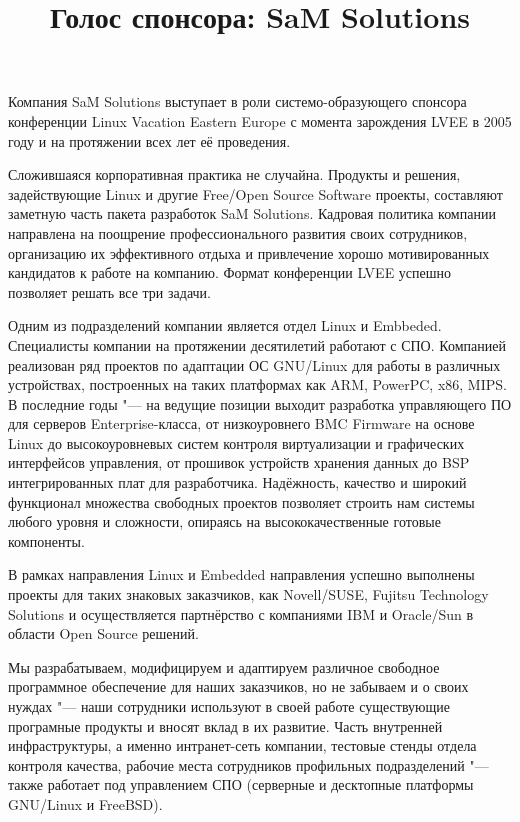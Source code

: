 \documentclass[10pt, a5paper]{article}
\begin{document}
\title{Голос спонсора: SaM Solutions}
\date{}
\maketitle

Компания SaM Solutions выступает в роли системо-образующего спонсора конференции Linux Vacation Eastern Europe с момента зарождения LVEE в 2005 году и на протяжении всех лет её проведения. 

Сложившаяся корпоративная практика не случайна. Продукты и решения, задействующие Linux и другие Free/Open Source Software проекты, составляют заметную часть пакета разработок SaM Solutions. Кадровая политика компании направлена на поощрение профессионального развития своих сотрудников, организацию их эффективного отдыха и привлечение хорошо мотивированных кандидатов к работе на компанию. Формат конференции LVEE успешно позволяет решать все три задачи. 

Одним из подразделений компании является отдел Linux и \linebreak Embbeded. Специалисты компании на протяжении десятилетий работают с СПО. Компанией реализован ряд проектов по адаптации ОС GNU/Linux для работы в различных устройствах, построенных на таких платформах как ARM, PowerPC, x86, MIPS. В последние годы "--- на ведущие позиции выходит разработка управляющего ПО для серверов Enterprise-класса, от низкоуровнего BMC Firmware на основе Linux до высокоуровневых систем контроля виртуализации и графических интерфейсов управления, от прошивок устройств хранения данных до BSP интегрированных плат для разработчика. Надёжность, качество и широкий функционал множества свободных проектов позволяет строить нам системы любого уровня и сложности, опираясь на высококачественные готовые компоненты.

В рамках направления Linux и Embedded направления успешно выполнены проекты для таких знаковых заказчиков, как  \linebreak Novell/SUSE, Fujitsu Technology Solutions  и осуществляется партнёрство с компаниями IBM и Oracle/Sun в области Open Source решений.

Мы разрабатываем, модифицируем и адаптируем различное свободное программное обеспечение для наших заказчиков, но не забываем и о своих нуждах "--- наши сотрудники используют в своей работе существующие програмные продукты и вносят вклад в их развитие. Часть внутренней инфраструктуры, а именно интранет-сеть компании, тестовые стенды отдела контроля качества, рабочие места сотрудников профильных подразделений "--- также работает под управлением СПО (серверные и десктопные платформы GNU/Linux и FreeBSD). 
\end{document}
